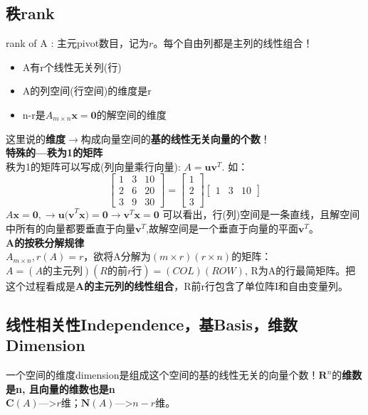     \subsection{秩rank}
    rank of A : 主元pivot数目，记为$r$。\quad 每个自由列都是主列的线性组合！
    \begin{itemize}
        \item A有r个线性无关列(行)
        \item A的列空间(行空间)的维度是r
        \item n-r是$A_{m\times n}\bm{x}=\bm{0}$的解空间的维度
    \end{itemize}
    这里说的\textbf{维度}$\rightarrow$构成向量空间的\textbf{基的线性无关向量的个数}！\\
    \textbf{特殊的---秩为1的矩阵}\\
    秩为1的矩阵可以写成(列向量乘行向量): $A=\bm{uv}^T$. \quad 如：
    $$
    \begin{bmatrix}
        1 & 3 & 10\\
        2 & 6 & 20\\
        3 & 9 & 30
    \end{bmatrix}
    =
    \begin{bmatrix}
        1\\
        2\\
        3
    \end{bmatrix}
    \begin{bmatrix}
        1 & 3 & 10
    \end{bmatrix}
    $$
    $A\bm{x}=\bm{0}, \rightarrow \bm{u(v}^T\bm{x})=\bm{0} \rightarrow \bm{v}^T\bm{x}=\bm{0}$
    可以看出，行(列)空间是一条直线，且解空间中所有的向量都要垂直于向量$\bm{v}^T$,故解空间是一个垂直于向量的平面$\bm{v}^T$。
    \\
    \textbf{A的按秩分解规律}\\
    $A_{m\times n}, r(A)=r$，欲将A分解为$(m\times r)(r \times n)$的矩阵：\\
    $A = (A \textbf{的主元列})(R的\textbf{前}r\textbf{行})=(COL)(ROW)$, R为A的行最简矩阵。把这个过程看成是\textbf{A的主元列的线性组合}，R前r行包含了单位阵I和自由变量列。

    \subsection{线性相关性Independence，基Basis，维数Dimension}
    一个空间的维度dimension是组成这个空间的基的线性无关的向量个数！$\mathbf{R}^{n}$的\textbf{维数是n, 且向量的维数也是n}\\
    $\mathbf{C}(A)$--->$r$维；$\mathbf{N}(A)$--->$n-r$维。\\
